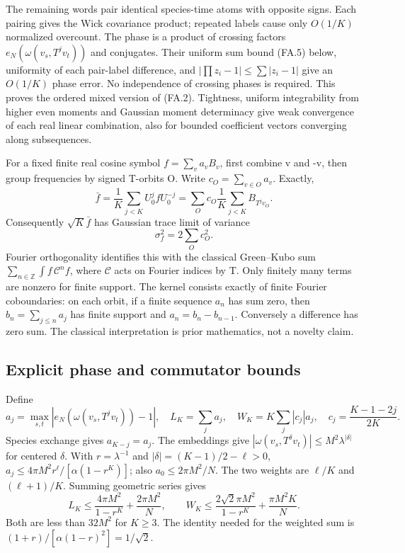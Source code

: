 The remaining words pair identical species-time atoms with opposite signs. Each pairing gives the Wick covariance product; repeated labels cause only \(O(1/K)\) normalized overcount. The phase is a product of crossing factors \(e_N(\omega(v_s,T^jv_t))\) and conjugates. Their uniform sum bound (FA.5) below, uniformity of each pair-label difference, and \(|\prod z_i-1|\leq\sum|z_i-1|\) give an \(O(1/K)\) phase error. No independence of crossing phases is required. This proves the ordered mixed version of (FA.2). Tightness, uniform integrability from higher even moments and Gaussian moment determinacy give weak convergence of each real linear combination, also for bounded coefficient vectors converging along subsequences.

For a fixed finite real cosine symbol \(f=\sum_v a_v B_v\), first combine v and -v, then group frequencies by signed T-orbits O. Write \(c_O=\sum_{v\in O}a_v\). Exactly, \[
 \bar f=\frac1K\sum_{j<K}U_0^jfU_0^{-j}=\sum_O c_O\frac1K\sum_{j<K}B_{T^jv_O}.
\] Consequently \(\sqrt K\bar f\) has Gaussian trace limit of variance \[
 \sigma_f^2=2\sum_Oc_O^2.                                    \tag{FA.4}
\] Fourier orthogonality identifies this with the classical Green--Kubo sum \(\sum_{n\in\mathbb Z}\int f\,\mathcal C^nf\), where \(\mathcal C\) acts on Fourier indices by T. Only finitely many terms are nonzero for finite support. The kernel consists exactly of finite Fourier coboundaries: on each orbit, if a finite sequence \(a_{n}\) has sum zero, then \(b_n=\sum_{j\leq n}a_j\) has finite support and \(a_n=b_n-b_{n-1}\). Conversely a difference has zero sum. The classical interpretation is prior mathematics, not a novelty claim.

\subsection{Explicit phase and commutator bounds}\label{finite_fourier:explicit-phase-and-commutator-bounds}

Define \[
 a_j=\max_{s,t}|e_N(\omega(v_s,T^jv_t))-1|,\quad L_K=\sum_ja_j,\quad W_K=K\sum_j|c_j|a_j,\quad c_j=\frac{K-1-2j}{2K}.
\] Species exchange gives \(a_{K-j}=a_j\). The embeddings give \(|\omega(v_s,T^\delta v_t)|\leq M^2\lambda^{|\delta|}\) for centered \(\delta\). With \(r=\lambda^{-1}\) and \(|\delta|=(K-1)/2-\ell>0\), \(a_j\leq4\pi M^2r^\ell/[\alpha(1-r^K)]\); also \(a_0\leq2\pi M^2/N\). The two weights are \(\ell/K\) and \((\ell+1)/K\). Summing geometric series gives \[
 L_K\leq\frac{4\pi M^2}{1-r^K}+\frac{2\pi M^2}{N},\qquad W_K\leq\frac{2\sqrt2\pi M^2}{1-r^K}+\frac{\pi M^2K}{N}. \tag{FA.5}
\] Both are less than \(32M^2\) for \(K\geq3\). The identity needed for the weighted sum is \((1+r)/[\alpha(1-r)^2]=1/\sqrt2\).

